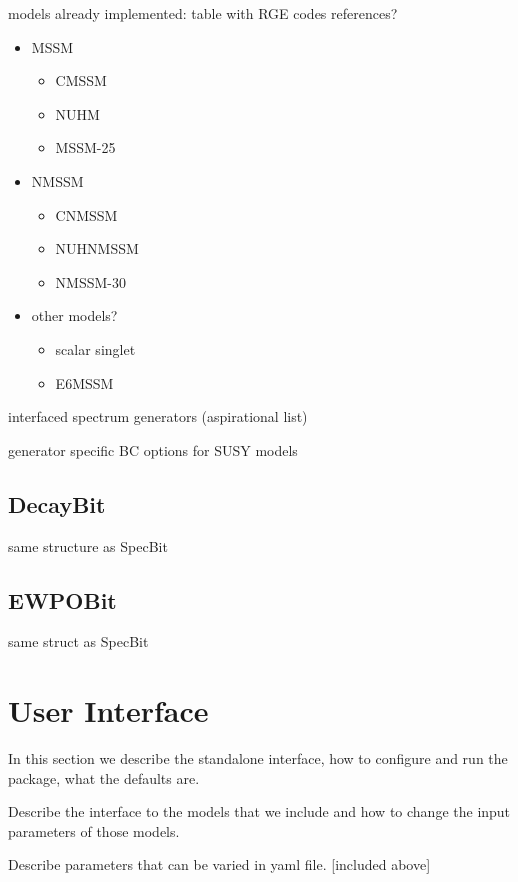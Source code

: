 \documentclass[11pt,a4paper]{article}
\begin{document}
models already implemented: table with RGE codes references?

\begin{itemize} 
\item MSSM
  \begin{itemize}
  \item CMSSM 
  \item NUHM 
  \item MSSM-25
  \end{itemize} 
\item NMSSM
  \begin{itemize}
  \item CNMSSM  
  \item NUHNMSSM 
  \item NMSSM-30
  \end{itemize}
\item other models?
  \begin{itemize}
  \item scalar singlet
  \item E6MSSM  
  \end{itemize}
\end{itemize}  

interfaced spectrum generators (aspirational list)
         
generator specific BC options for SUSY models

\subsection{DecayBit}

same structure as SpecBit

\subsection{EWPOBit}

same struct as SpecBit


\section{User Interface}

In this section we describe the standalone interface, how to configure and run the package, what the defaults are.

Describe the interface to the models that we include and how to change the input parameters of those models.

Describe parameters that can be varied in yaml file. [included above]
\end{document}
